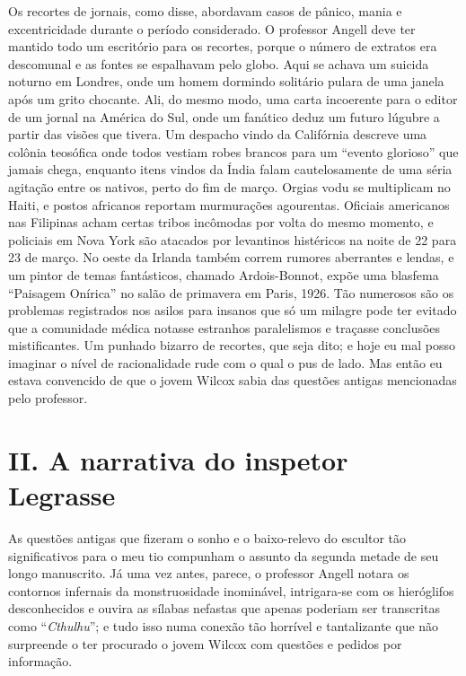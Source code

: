 Os recortes de jornais, como disse, abordavam casos de pânico, mania e
excentricidade durante o período considerado. O professor Angell deve
ter mantido todo um escritório para os recortes, porque o número de
extratos era descomunal e as fontes se espalhavam pelo globo. Aqui se
achava um suicida noturno em Londres, onde um homem dormindo solitário
pulara de uma janela após um grito chocante. Ali, do mesmo modo, uma
carta incoerente para o editor de um jornal na América do Sul, onde um
fanático deduz um futuro lúgubre a partir das visões que tivera. Um
despacho vindo da Califórnia descreve uma colônia teosófica onde todos
vestiam robes brancos para um ``evento glorioso'' que jamais chega,
enquanto itens vindos da Índia falam cautelosamente de uma séria
agitação entre os nativos, perto do fim de março. Orgias vodu se
multiplicam no Haiti, e postos africanos reportam murmurações
agourentas. Oficiais americanos nas Filipinas acham certas tribos
incômodas por volta do mesmo momento, e policiais em Nova York são
atacados por levantinos histéricos na noite de 22 para 23 de março. No
oeste da Irlanda também correm rumores aberrantes e lendas, e um pintor
de temas fantásticos, chamado Ardois-Bonnot, expõe uma blasfema
``Paisagem Onírica'' no salão de primavera em Paris, 1926. Tão numerosos
são os problemas registrados nos asilos para insanos que só um milagre
pode ter evitado que a comunidade médica notasse estranhos paralelismos
e traçasse conclusões mistificantes. Um punhado bizarro de recortes, que
seja dito; e hoje eu mal posso imaginar o nível de racionalidade rude
com o qual o pus de lado. Mas então eu estava convencido de que o jovem
Wilcox sabia das questões antigas mencionadas pelo professor.

\chapter{II. A narrativa do inspetor Legrasse}

As questões antigas que fizeram o sonho e o baixo-relevo do escultor tão
significativos para o meu tio compunham o assunto da segunda metade de
seu longo manuscrito. Já uma vez antes, parece, o professor Angell
notara os contornos infernais da monstruosidade inominável, intrigara-se
com os hieróglifos desconhecidos e ouvira as sílabas nefastas que apenas
poderiam ser transcritas como ``\emph{Cthulhu}''; e tudo isso numa
conexão tão horrível e tantalizante que não surpreende o ter procurado o
jovem Wilcox com questões e pedidos por informação.

